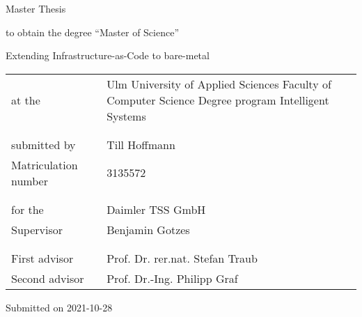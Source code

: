 \begin{titlepage}
  \vspace*{4cm}

  {\normalfont\sffamily\huge Master Thesis}

  \vspace{0.5cm}
  to obtain the degree \enquote{Master of Science}

  \vspace{2.0cm}
  {\normalfont\sffamily\large Extending Infrastructure-as-Code to bare-metal}

  \bigskip

  \begin{tabular}{ @{} p{} p{} }
      at the & Ulm University of Applied Sciences
      \newline
      Faculty of Computer Science
      \newline
      Degree program Intelligent Systems  \\
      & \\
      & \\
      submitted by & Till Hoffmann \\
      Matriculation number & 3135572 \\
      & \\
      & \\
      for the & Daimler TSS GmbH \\
      Supervisor & Benjamin Gotzes \\
      & \\
      & \\
      First advisor & Prof. Dr. rer.nat. Stefan Traub \\
      Second advisor & Prof. Dr.-Ing. Philipp Graf \\
  \end{tabular}

  \vspace{1cm}
  
  Submitted on 2021-10-28

\end{titlepage}
